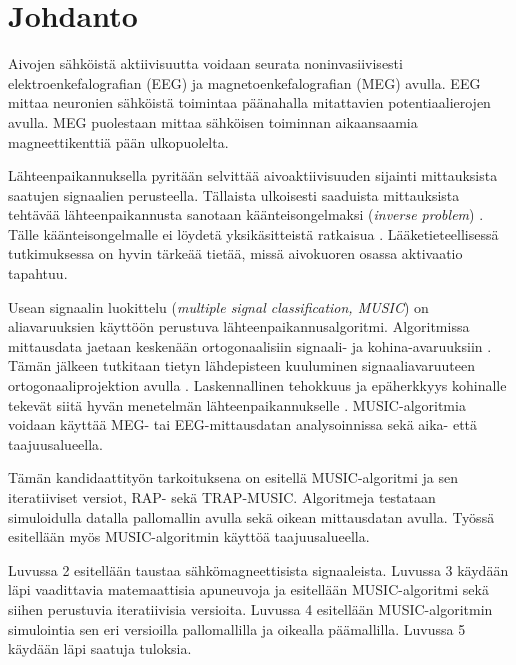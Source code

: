 \section{Johdanto}

Aivojen sähköistä aktiivisuutta voidaan seurata noninvasiivisesti elektroenkefalografian (EEG) ja magnetoenkefalografian (MEG) avulla. EEG mittaa neuronien sähköistä toimintaa päänahalla mitattavien potentiaalierojen avulla. MEG puolestaan mittaa sähköisen toiminnan aikaansaamia magneettikenttiä pään ulkopuolelta. \citep{Hamalainen1993MagnetoencephalographytheoryBrain}

Lähteenpaikannuksella pyritään selvittää aivoaktiivisuuden sijainti mittauksista saatujen signaalien perusteella. Tällaista ulkoisesti saaduista mittauksista tehtävää lähteenpaikannusta sanotaan käänteisongelmaksi (\textit{inverse problem}) \citep[s. 2]{hansen2010meg}. Tälle käänteisongelmalle ei löydetä yksikäsitteistä ratkaisua \citep{Sarvas1987Basic}. Lääketieteellisessä tutkimuksessa on hyvin tärkeää tietää, missä aivokuoren osassa aktivaatio tapahtuu. 

Usean signaalin luokittelu (\textit{multiple signal classification, MUSIC}) \citep{Schmidt1986MultipleEstimation} on aliavaruuksien käyttöön perustuva lähteenpaikannusalgoritmi. Algoritmissa mittausdata jaetaan keskenään ortogonaalisiin signaali- ja kohina-avaruuksiin \citep{Schmidt1986MultipleEstimation, Mosher1999SourceMUSIC}. Tämän jälkeen tutkitaan tietyn lähdepisteen kuuluminen signaaliavaruuteen ortogonaaliprojektion avulla \citep{Mosher1999SourceMUSIC}. Laskennallinen tehokkuus ja epäherkkyys kohinalle tekevät siitä hyvän menetelmän lähteenpaikannukselle \citep{Makela2018TruncatedLocalization}. MUSIC-algoritmia voidaan käyttää MEG- tai EEG-mittausdatan analysoinnissa sekä aika- että taajuusalueella.

Tämän kandidaattityön tarkoituksena on esitellä MUSIC-algoritmi ja sen iteratiiviset versiot, RAP- sekä TRAP-MUSIC. Algoritmeja testataan simuloidulla datalla pallomallin avulla sekä oikean mittausdatan avulla. Työssä esitellään myös MUSIC-algoritmin käyttöä taajuusalueella.

Luvussa 2 esitellään taustaa sähkömagneettisista signaaleista. Luvussa 3 käydään läpi vaadittavia matemaattisia apuneuvoja ja esitellään MUSIC-algoritmi sekä siihen perustuvia iteratiivisia versioita. Luvussa 4 esitellään MUSIC-algoritmin simulointia sen eri versioilla pallomallilla ja oikealla päämallilla. Luvussa 5 käydään läpi saatuja tuloksia.